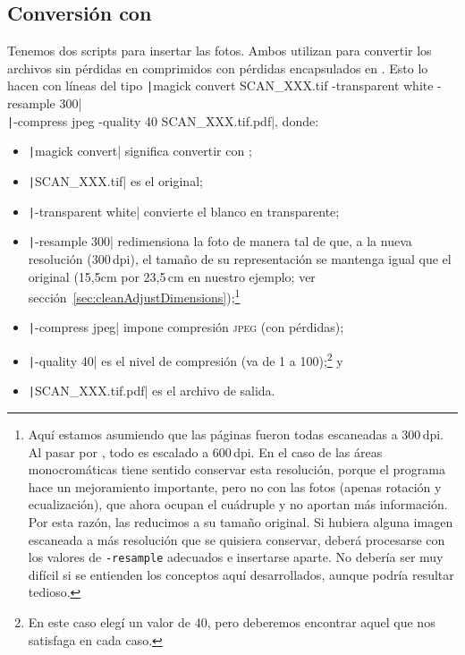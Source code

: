 \documentclass[%
	a5paper,
	10pt,
	twoside,
	openright,
	final,
]{memoir}
\begin{document}
{	\subsection{Conversión con \imagemagick\label{sec:pdfPhotosImageMagick}} Tenemos dos scripts para insertar las fotos. Ambos utilizan \imagemagick para convertir los archivos \tiff sin pérdidas en \jpeg comprimidos con pérdidas encapsulados en \pdf. Esto lo hacen con líneas del tipo \texttt|magick convert SCAN_XXX.tif -transparent white -resample 300|\\
	\texttt|-compress jpeg -quality 40 SCAN_XXX.tif.pdf|, donde:

	\begin{itemize}[noitemsep]
		\item \texttt|magick convert| significa convertir con \imagemagick;
		\item \texttt|SCAN_XXX.tif| es el \tiff original;
		\item \texttt|-transparent white| convierte el blanco en transparente;
		\item \texttt|-resample 300| redimensiona la foto de manera tal de que, a la nueva resolución (300\,dpi), el tamaño de su representación se mantenga igual que el original (15,5cm por 23,5\,cm en nuestro ejemplo; ver sección~\ref{sec:cleanAdjustDimensions});\footnote{\label{foot:resample}Aquí estamos asumiendo que las páginas fueron todas escaneadas a 300\,dpi. Al pasar por \scantailor, todo es escalado a 600\,dpi. En el caso de las áreas monocromáticas tiene sentido conservar esta resolución, porque el programa hace un mejoramiento importante, pero no con las fotos (apenas rotación y ecualización), que ahora ocupan el cuádruple y no aportan más información. Por esta razón, las reducimos a su tamaño original. Si hubiera alguna imagen escaneada a más resolución que se quisiera conservar, deberá procesarse con los valores de \texttt{-resample} adecuados e insertarse aparte. No debería ser muy difícil si se entienden los conceptos aquí desarrollados, aunque podría resultar tedioso.}
		\item \texttt|-compress jpeg| impone compresión \textsc{jpeg} (con pérdidas);
		\item \texttt|-quality 40| es el nivel de compresión (va de 1 a 100);\footnote{En este caso elegí un valor de 40, pero deberemos encontrar aquel que nos satisfaga en cada caso.} y
		\item \texttt|SCAN_XXX.tif.pdf| es el archivo \pdf de salida.
	\end{itemize}

}
\end{document}
